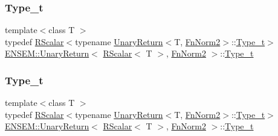 \subsubsection{\texorpdfstring{Type\_t}{Type\_t}\hspace{0.1cm}{\footnotesize\ttfamily [1/3]}}
{\footnotesize\ttfamily template$<$class T $>$ \\
typedef \mbox{\hyperlink{classENSEM_1_1RScalar}{R\+Scalar}}$<$typename \mbox{\hyperlink{structENSEM_1_1UnaryReturn}{Unary\+Return}}$<$T, \mbox{\hyperlink{structENSEM_1_1FnNorm2}{Fn\+Norm2}}$>$\+::\mbox{\hyperlink{structENSEM_1_1UnaryReturn_3_01RScalar_3_01T_01_4_00_01FnNorm2_01_4_a0b95acf355311a4c109012c267496961}{Type\+\_\+t}}$>$ \mbox{\hyperlink{structENSEM_1_1UnaryReturn}{E\+N\+S\+E\+M\+::\+Unary\+Return}}$<$ \mbox{\hyperlink{classENSEM_1_1RScalar}{R\+Scalar}}$<$ T $>$, \mbox{\hyperlink{structENSEM_1_1FnNorm2}{Fn\+Norm2}} $>$\+::\mbox{\hyperlink{structENSEM_1_1UnaryReturn_3_01RScalar_3_01T_01_4_00_01FnNorm2_01_4_a0b95acf355311a4c109012c267496961}{Type\+\_\+t}}}

\mbox{\label{structENSEM_1_1UnaryReturn_3_01RScalar_3_01T_01_4_00_01FnNorm2_01_4_a0b95acf355311a4c109012c267496961}} 
\subsubsection{\texorpdfstring{Type\_t}{Type\_t}\hspace{0.1cm}{\footnotesize\ttfamily [2/3]}}
{\footnotesize\ttfamily template$<$class T $>$ \\
typedef \mbox{\hyperlink{classENSEM_1_1RScalar}{R\+Scalar}}$<$typename \mbox{\hyperlink{structENSEM_1_1UnaryReturn}{Unary\+Return}}$<$T, \mbox{\hyperlink{structENSEM_1_1FnNorm2}{Fn\+Norm2}}$>$\+::\mbox{\hyperlink{structENSEM_1_1UnaryReturn_3_01RScalar_3_01T_01_4_00_01FnNorm2_01_4_a0b95acf355311a4c109012c267496961}{Type\+\_\+t}}$>$ \mbox{\hyperlink{structENSEM_1_1UnaryReturn}{E\+N\+S\+E\+M\+::\+Unary\+Return}}$<$ \mbox{\hyperlink{classENSEM_1_1RScalar}{R\+Scalar}}$<$ T $>$, \mbox{\hyperlink{structENSEM_1_1FnNorm2}{Fn\+Norm2}} $>$\+::\mbox{\hyperlink{structENSEM_1_1UnaryReturn_3_01RScalar_3_01T_01_4_00_01FnNorm2_01_4_a0b95acf355311a4c109012c267496961}{Type\+\_\+t}}}

